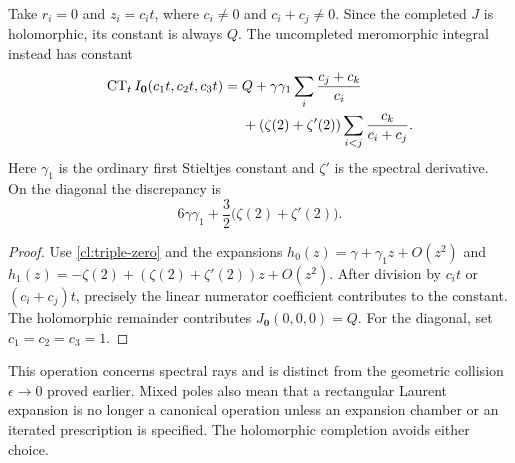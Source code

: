 \begin{proposition}
\label{cl:rays}
Take $r_i=0$ and $z_i=c_i t$, where $c_i\ne0$ and $c_i+c_j\ne0$.
Since the completed $J$ is holomorphic, its constant is always $Q$.
The uncompleted meromorphic integral instead has constant
\begin{align}
 \operatorname{CT}_{t}I_{\boldsymbol0}(c_1t,c_2t,c_3t)
 ={}&Q+\gamma\gamma_1\sum_i\frac{c_j+c_k}{c_i}\notag\\
       &+(\zeta(2)+\zeta'(2))\sum_{i<j}\frac{c_k}{c_i+c_j}.
       \label{cl:ray-constant}
\end{align}
Here $\gamma_1$ is the ordinary first Stieltjes constant and $\zeta'$
is the spectral derivative. On the diagonal the discrepancy is
\[
 6\gamma\gamma_1+\frac32\bigl(\zeta(2)+\zeta'(2)\bigr).
\]
\end{proposition}
\begin{proof}
Use \eqref{cl:triple-zero} and the expansions
$h_0(z)=\gamma+\gamma_1z+O(z^2)$ and
$h_1(z)=-\zeta(2)+(\zeta(2)+\zeta'(2))z+O(z^2)$.
After division by $c_it$ or $(c_i+c_j)t$, precisely the linear
numerator coefficient contributes to the constant. The holomorphic
remainder contributes $J_{\boldsymbol0}(0,0,0)=Q$. For the diagonal,
set $c_1=c_2=c_3=1$.
\end{proof}
This operation concerns spectral rays and is distinct from the
geometric collision $\epsilon\to0$ proved earlier. Mixed poles also
mean that a rectangular Laurent expansion is no longer a canonical
operation unless an expansion chamber or an iterated prescription is
specified. The holomorphic completion avoids either choice.


